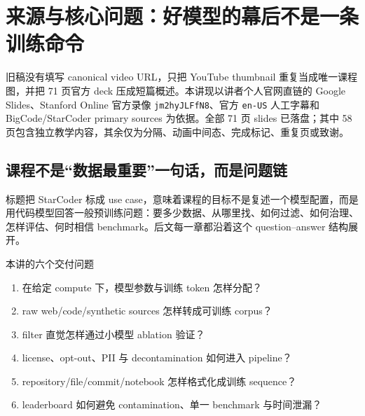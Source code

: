 \section{来源与核心问题：好模型的幕后不是一条训练命令}

旧稿没有填写 canonical video URL，只把 YouTube thumbnail 重复当成唯一课程图，并把 71 页官方 deck 压成短篇概述。本讲现以讲者个人官网直链的 Google Slides、Stanford Online 官方录像 \texttt{jm2hyJLFfN8}、官方 \texttt{en-US} 人工字幕和 BigCode/StarCoder primary sources 为依据。全部 71 页 slides 已落盘；其中 58 页包含独立教学内容，其余仅为分隔、动画中间态、完成标记、重复页或致谢。

\subsection{课程不是“数据最重要”一句话，而是问题链}

标题把 StarCoder 标成 use case，意味着课程的目标不是复述一个模型配置，而是用代码模型回答一般预训练问题：要多少数据、从哪里找、如何过滤、如何治理、怎样评估、何时相信 benchmark。后文每一章都沿着这个 question--answer 结构展开。



\begin{importantbox}{本讲的六个交付问题}
\begin{enumerate}
  \item 在给定 compute 下，模型参数与训练 token 怎样分配？
  \item raw web/code/synthetic sources 怎样转成可训练 corpus？
  \item filter 直觉怎样通过小模型 ablation 验证？
  \item license、opt-out、PII 与 decontamination 如何进入 pipeline？
  \item repository/file/commit/notebook 怎样格式化成训练 sequence？
  \item leaderboard 如何避免 contamination、单一 benchmark 与时间泄漏？
\end{enumerate}
\end{importantbox}


